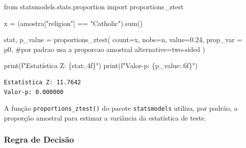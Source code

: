 \documentclass[
  letterpaper,
  DIV=11,
  numbers=noendperiod]{scrreprt}
\newenvironment{Shaded}{\begin{snugshade}}{\end{snugshade}}
\newcommand{\BuiltInTok}[1]{\textcolor[rgb]{0.00,0.23,0.31}{#1}}
\newcommand{\CommentTok}[1]{\textcolor[rgb]{0.37,0.37,0.37}{#1}}
\newcommand{\FloatTok}[1]{\textcolor[rgb]{0.68,0.00,0.00}{#1}}
\newcommand{\ImportTok}[1]{\textcolor[rgb]{0.00,0.46,0.62}{#1}}
\newcommand{\NormalTok}[1]{\textcolor[rgb]{0.00,0.23,0.31}{#1}}
\newcommand{\OperatorTok}[1]{\textcolor[rgb]{0.37,0.37,0.37}{#1}}
\newcommand{\SpecialCharTok}[1]{\textcolor[rgb]{0.37,0.37,0.37}{#1}}
\newcommand{\SpecialStringTok}[1]{\textcolor[rgb]{0.13,0.47,0.30}{#1}}
\newcommand{\StringTok}[1]{\textcolor[rgb]{0.13,0.47,0.30}{#1}}
\begin{document}
\begin{Shaded}
\begin{Highlighting}[]
\ImportTok{from}\NormalTok{ statsmodels.stats.proportion }\ImportTok{import}\NormalTok{ proportions\_ztest}

\NormalTok{x }\OperatorTok{=}\NormalTok{ (amostra[}\StringTok{"religion"}\NormalTok{] }\OperatorTok{==} \StringTok{"Catholic"}\NormalTok{).}\BuiltInTok{sum}\NormalTok{()}

\NormalTok{stat, p\_value }\OperatorTok{=}\NormalTok{ proportions\_ztest(}
\NormalTok{    count}\OperatorTok{=}\NormalTok{x,}
\NormalTok{    nobs}\OperatorTok{=}\NormalTok{n,}
\NormalTok{    value}\OperatorTok{=}\FloatTok{0.24}\NormalTok{,}
\NormalTok{    prop\_var }\OperatorTok{=}\NormalTok{ p0, }\CommentTok{\#por padrao usa a proporcao amostral}
\NormalTok{    alternative}\OperatorTok{=}\StringTok{\textquotesingle{}two{-}sided\textquotesingle{}}
\NormalTok{)}

\BuiltInTok{print}\NormalTok{(}\SpecialStringTok{f"Estatística Z: }\SpecialCharTok{\{}\NormalTok{stat}\SpecialCharTok{:.4f\}}\SpecialStringTok{"}\NormalTok{)}
\BuiltInTok{print}\NormalTok{(}\SpecialStringTok{f"Valor{-}p: }\SpecialCharTok{\{}\NormalTok{p\_value}\SpecialCharTok{:.6f\}}\SpecialStringTok{"}\NormalTok{)}
\end{Highlighting}
\end{Shaded}

\begin{verbatim}
Estatística Z: 11.7642
Valor-p: 0.000000
\end{verbatim}

\begin{tcolorbox}[enhanced jigsaw, colback=white, leftrule=.75mm, colbacktitle=quarto-callout-note-color!10!white, breakable, titlerule=0mm, bottomtitle=1mm, title=\textcolor{quarto-callout-note-color}{\faInfo}\hspace{0.5em}{Observação}, colframe=quarto-callout-note-color-frame, toprule=.15mm, opacityback=0, bottomrule=.15mm, opacitybacktitle=0.6, arc=.35mm, toptitle=1mm, rightrule=.15mm, coltitle=black, left=2mm]

A função \texttt{proportions\_ztest()} do pacote \texttt{statsmodels}
utiliza, por padrão, a proporção amostral para estimar a variância da
estatística de teste.

\end{tcolorbox}

\subsubsection{Regra de Decisão}\label{regra-de-decisuxe3o-3}
\end{document}
